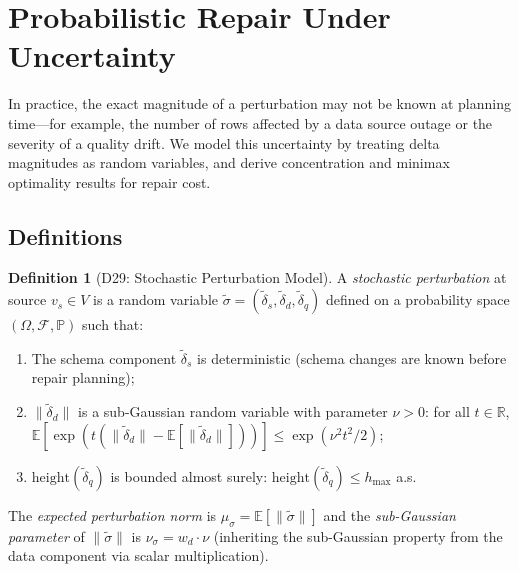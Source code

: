 \documentclass[11pt,a4paper]{article}
\theoremstyle{definition}
\newtheorem{definition}[theorem]{Definition}
\newcommand{\bbR}{\mathbb{R}}
\newcommand{\bbP}{\mathbb{P}}
\newcommand{\bbE}{\mathbb{E}}
\begin{document}
\section{Probabilistic Repair Under Uncertainty}
\label{sec:probabilistic}

In practice, the exact magnitude of a perturbation may not be known at
planning time---for example, the number of rows affected by a data source
outage or the severity of a quality drift.  We model this uncertainty by
treating delta magnitudes as random variables, and derive concentration
and minimax optimality results for repair cost.

\subsection{Definitions}

\begin{definition}[D29: Stochastic Perturbation Model]\label{def:stochastic-pert}
A \emph{stochastic perturbation} at source $v_s \in V$ is a random variable
$\tilde{\sigma} = (\tilde{\delta}_s, \tilde{\delta}_d, \tilde{\delta}_q)$
defined on a probability space $(\Omega, \mathcal{F}, \bbP)$ such that:
\begin{enumerate}[nosep]
  \item The schema component $\tilde{\delta}_s$ is deterministic (schema
    changes are known before repair planning);
  \item $\|\tilde{\delta}_d\|$ is a sub-Gaussian random variable with
    parameter $\nu > 0$: for all $t \in \bbR$,
    $\bbE[\exp(t(\|\tilde{\delta}_d\| - \bbE[\|\tilde{\delta}_d\|]))]
    \leq \exp(\nu^2 t^2 / 2)$;
  \item $\mathrm{height}(\tilde{\delta}_q)$ is bounded almost surely:
    $\mathrm{height}(\tilde{\delta}_q) \leq h_{\max}$ a.s.
\end{enumerate}
The \emph{expected perturbation norm} is
$\mu_\sigma = \bbE[\|\tilde{\sigma}\|]$ and the \emph{sub-Gaussian parameter}
of $\|\tilde{\sigma}\|$ is $\nu_\sigma = w_d \cdot \nu$ (inheriting the
sub-Gaussian property from the data component via scalar multiplication).
\end{definition}
\end{document}

